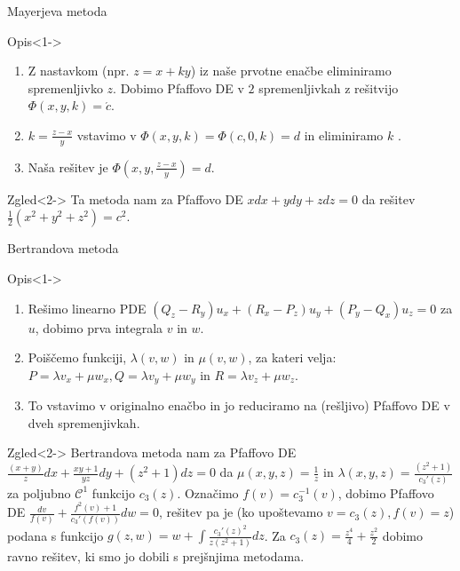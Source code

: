 \documentclass[t, 8pt]{beamer} %
\newcommand{\fillblack}[1]{
	\begin{tikzpicture}[remember picture, overlay]
		\node [shift={(0 cm,0cm)}]  at (current page.south west)
		{%
			\begin{tikzpicture}[remember picture, overlay] at (current page.south west)
				\draw [fill=black] (0, 0) -- (0,#1 \paperheight) --
				(\paperwidth,#1 \paperheight) -- (\paperwidth,0) -- cycle ;
			\end{tikzpicture}
		};
		\draw (current page.north west) rectangle (current page.south east);
	\end{tikzpicture}
}
\begin{document}
		\begin{frame}{Mayerjeva metoda}
			\begin{block}{Opis}<1->
			\begin{enumerate}
				\item Z nastavkom (npr. $z = x + ky$) iz naše prvotne enačbe eliminiramo spremenljivko $z$. Dobimo Pfaffovo DE v $2$ spremenljivkah z rešitvijo $\Phi(x, y, k) = \acute{c}$.
				\item $k = \frac{z - x}{y}$ vstavimo v $\Phi(x, y, k) = \Phi(c, 0, k) = d$ in eliminiramo $k$ .
				\item Naša rešitev je $\Phi(x, y, \frac{z - x}{y}) = d$.
			\end{enumerate}
			\end{block}
			\begin{block}{Zgled}<2->
				Ta metoda nam za Pfaffovo DE $xdx + ydy + zdz = 0$ da rešitev $\frac{1}{2}(x^2 + y^2 + z^2) = c^2$.
			\end{block}
		\end{frame}
		
		\begin{frame}{Bertrandova metoda}
			\begin{block}{Opis}<1->
				\begin{enumerate}
					\item Rešimo linearno PDE $(Q_z - R_y)u_x + (R_x - P_z)u_y + (P_y - Q_x)u_z = 0$ za $u$, dobimo prva integrala $v$ in $w$.
					\item Poiščemo funkciji, $\lambda(v, w)$ in $\mu(v, w)$, za kateri velja: 
						$P = \lambda v_x + \mu w_x, Q = \lambda v_y + \mu w_y$ in $R = \lambda v_z + \mu w_z$.
					\item To vstavimo v originalno enačbo in jo reduciramo na (rešljivo) Pfaffovo DE v dveh spremenjivkah.
				\end{enumerate}
			\end{block}
			\begin{block}{Zgled}<2->
				Bertrandova metoda nam za Pfaffovo DE $\frac{(x+y)}{z}dx + \frac{xy+1}{yz}dy + (z^2 + 1)dz = 0$ da $\mu(x, y, z) = \frac{1}{z}$ in $\lambda(x, y, z) = \frac{(z^2 +1)}{c_3'(z)}$ za poljubno $\mathcal{C}^1$ funkcijo $c_3(z)$. Označimo $f(v) = c_3^{-1}(v)$, dobimo Pfaffovo DE $\frac{dv}{f(v)} + \frac{f^2(v)+1}{c_3'(f(v))}dw = 0$, rešitev pa je (ko upoštevamo $v = c_3(z), f(v) = z$) podana s funkcijo $g(z, w) = w + \int \frac{c_3'(z)^2}{z(z^2 + 1)}dz$. Za $c_3(z) = \frac{z^4}{4} + \frac{z^2}{2}$ dobimo ravno rešitev, ki smo jo dobili s prejšnjima metodama.
			\end{block}
		\end{frame}
		
\end{document}
